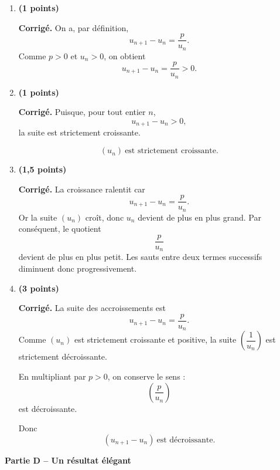 \documentclass[11pt,a4paper]{article}
\newcommand{\bareme}[1]{\hfill{\color{blue!70!black}\textbf{(#1 points)}}}
\newcommand{\corr}{\noindent\textcolor{blue!70!black}{\textbf{Corrigé. }}}
\begin{document}
\begin{enumerate}[label=\textbf{C.\arabic*.}, leftmargin=0.9cm]

\item \bareme{1}

\corr On a, par définition,
\[
u_{n+1}-u_n=\frac{p}{u_n}.
\]
Comme $p>0$ et $u_n>0$, on obtient
\[
\boxed{u_{n+1}-u_n=\frac{p}{u_n}>0.}
\]

\item \bareme{1}

\corr Puisque, pour tout entier $n$,
\[
u_{n+1}-u_n>0,
\]
la suite est strictement croissante.

\[
\boxed{(u_n)\ \text{est strictement croissante}.}
\]

\item \bareme{1,5}

\corr La croissance ralentit car
\[
u_{n+1}-u_n=\frac{p}{u_n}.
\]
Or la suite $(u_n)$ croît, donc $u_n$ devient de plus en plus grand. Par conséquent, le quotient
\[
\frac{p}{u_n}
\]
devient de plus en plus petit. Les sauts entre deux termes successifs diminuent donc progressivement.

\item \bareme{3}

\corr La suite des accroissements est
\[
u_{n+1}-u_n=\frac{p}{u_n}.
\]
Comme $(u_n)$ est strictement croissante et positive, la suite $\left(\dfrac1{u_n}\right)$ est strictement décroissante.

En multipliant par $p>0$, on conserve le sens :
\[
\left(\frac{p}{u_n}\right)
\]
est décroissante.

Donc
\[
\boxed{(u_{n+1}-u_n)\ \text{est décroissante}.}
\]

\end{enumerate}

\medskip

\textbf{Partie D -- Un résultat élégant}
\end{document}
